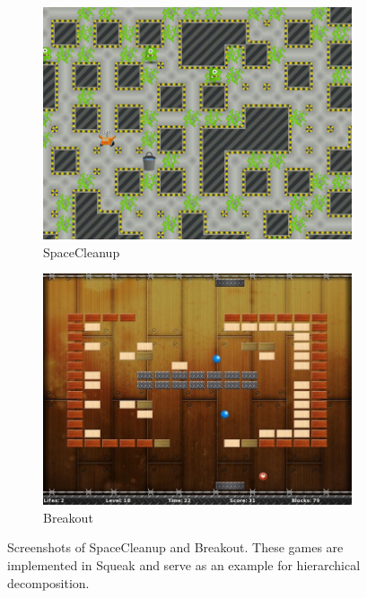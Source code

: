 \begin{figure}[!htp]
\centering
\begin{subfigure}[b]{0.45\textwidth}
    \includegraphics[width=\textwidth]{screen_scleanup.jpeg}
    \caption{SpaceCleanup}
\end{subfigure}
\qquad
\begin{subfigure}[b]{0.45\textwidth}
    \includegraphics[width=\textwidth]{screen_breakout.jpeg}
    \caption{Breakout}
\end{subfigure}
\caption[Screenshots of SpaceCleanup and Breakout]{Screenshots of SpaceCleanup and Breakout. These games are implemented in Squeak and serve as an example for hierarchical decomposition.}
\label{fig:usecase_games}
\end{figure}

